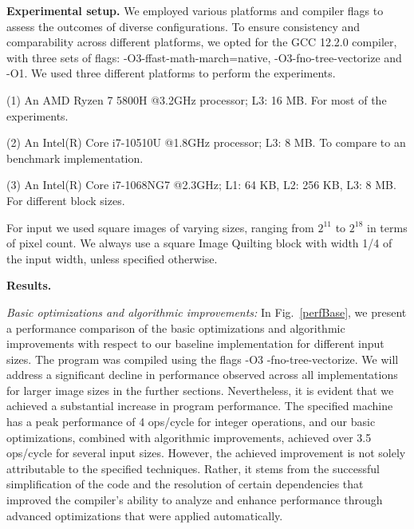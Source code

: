 \documentclass[letterpaper]{article}
\newcommand{\mypar}[1]{{\bf #1.}}
\newcommand{\inline}[1]{{\ttfamily\hyphenchar\font=45 #1}}
\begin{document}
\mypar{Experimental setup} 
We employed various platforms and compiler flags to assess the outcomes of diverse configurations. To ensure consistency and comparability across different platforms, we opted for the GCC 12.2.0 compiler, with three sets of flags: \inline{-O3-ffast-math-march=native}, \inline{-O3-fno-tree-vectorize} and \inline{-O1}. We used three different platforms to perform the experiments.

(1) An AMD Ryzen 7 5800H @3.2GHz processor; L3: 16 MB. For most of the experiments.

(2) An Intel(R) Core i7-10510U @1.8GHz processor; L3: 8 MB. To compare to an benchmark implementation.

(3) An Intel(R) Core i7-1068NG7 @2.3GHz; L1: 64 KB, L2: 256 KB, L3: 8 MB. For different block sizes.

For input we used square images of varying sizes, ranging from $2^{11}$ to $2^{18}$ in terms of pixel count. We always use a square Image Quilting block with width 1/4 of the input width, unless specified otherwise.

\mypar{Results}

\textit{Basic optimizations and algorithmic improvements:} In Fig.~\ref{perfBase}, we present a performance comparison of the basic optimizations and algorithmic improvements with respect to our baseline implementation for different input sizes. The program was compiled using the flags \inline{-O3 -fno-tree-vectorize}. We will address a significant decline in performance observed across all implementations for larger image sizes in the further sections. Nevertheless, it is evident that we achieved a substantial increase in program performance. The specified machine has a peak performance of 4 ops/cycle for integer operations, and our basic optimizations, combined with algorithmic improvements, achieved over 3.5 ops/cycle for several input sizes. However, the achieved improvement is not solely attributable to the specified techniques. Rather, it stems from the successful simplification of the code and the resolution of certain dependencies that improved the compiler's ability to analyze and enhance performance through advanced optimizations that were applied automatically.
\end{document}
